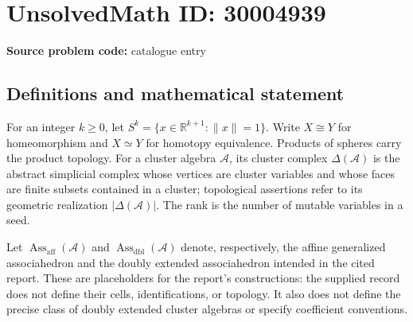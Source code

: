 \documentclass[11pt]{article}
\newcommand{\R}{\mathbb{R}}
\begin{document}
\section*{UnsolvedMath ID: 30004939}
\textbf{Source problem code:} catalogue entry
\subsection{Definitions and mathematical statement}
For an integer \(k\geq 0\), let \(S^k=\{x\in\R^{k+1}:\|x\|=1\}\). Write \(X\cong Y\) for homeomorphism and \(X\simeq Y\) for homotopy equivalence. Products of spheres carry the product topology. For a cluster algebra \(\mathcal A\), its cluster complex \(\Delta(\mathcal A)\) is the abstract simplicial complex whose vertices are cluster variables and whose faces are finite subsets contained in a cluster; topological assertions refer to its geometric realization \(|\Delta(\mathcal A)|\). The rank is the number of mutable variables in a seed.

Let \(\operatorname{Ass}_{\mathrm{aff}}(\mathcal A)\) and \(\operatorname{Ass}_{\mathrm{dbl}}(\mathcal A)\) denote, respectively, the affine generalized associahedron and the doubly extended associahedron intended in the cited report. These are placeholders for the report's constructions: the supplied record does not define their cells, identifications, or topology. It also does not define the precise class of doubly extended cluster algebras or specify coefficient conventions.
\end{document}
